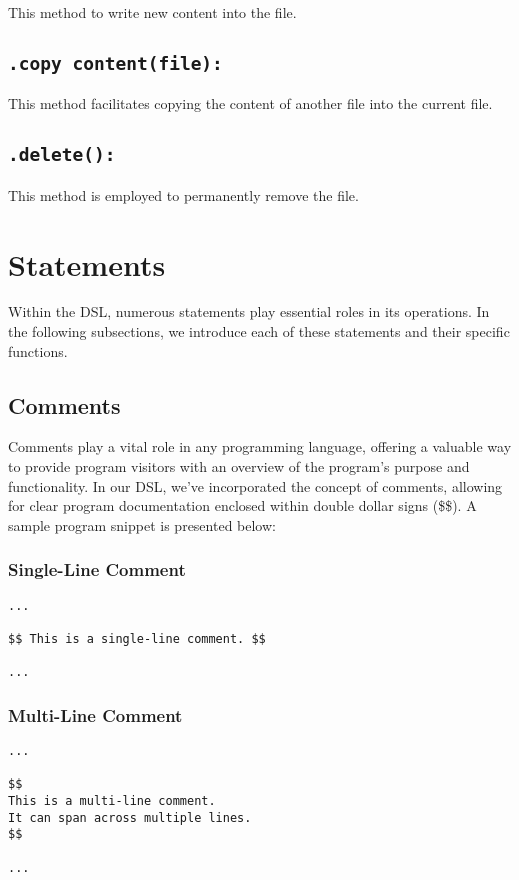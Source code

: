 \documentclass{article}
\begin{document}
This method to write new content into the file.
\subsection{\texttt{.copy content(file):}}

This method facilitates copying the content of another file into the current file.
\subsection{\texttt{.delete():}}

This method is employed to permanently remove the file.

\section{Statements}
Within the DSL, numerous statements play essential roles in its operations. In the following subsections, we introduce each of these statements and their specific functions.

\subsection{Comments}
Comments play a vital role in any programming language, offering a valuable way to provide program visitors with an overview of the program's purpose and functionality. In our DSL, we've incorporated the concept of comments, allowing for clear program documentation enclosed within double dollar signs (\$\$). A sample program snippet is presented below:

\subsubsection{Single-Line Comment}
\begin{verbatim}
...

$$ This is a single-line comment. $$

...
\end{verbatim}

\subsubsection{Multi-Line Comment}
\begin{verbatim}
...

$$
This is a multi-line comment.
It can span across multiple lines.
$$

...
\end{verbatim}
\end{document}

